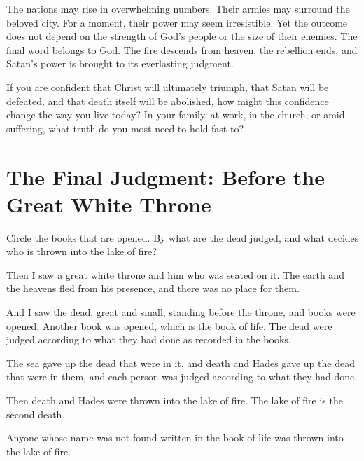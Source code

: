 The nations may rise in overwhelming numbers. Their armies may surround the beloved city. For a moment, their power may seem irresistible. Yet the outcome does not depend on the strength of God's people or the size of their enemies. The final word belongs to God. The fire descends from heaven, the rebellion ends, and Satan's power is brought to its everlasting judgment.

\begin{ReaderQuestion}
If you are confident that Christ will ultimately triumph, that Satan will be defeated, and that death itself will be abolished, how might this confidence change the way you live today? In your family, at work, in the church, or amid suffering, what truth do you most need to hold fast to?
\end{ReaderQuestion}

\section{The Final Judgment: Before the Great White Throne}

\begin{ScriptureBox2}{Circle the books that are opened. By what are the dead judged, and what decides who is thrown into the lake of fire?}

\item[20:11] Then I saw a great white throne and him who was seated on it. The earth and the heavens fled from his presence, and there was no place for them.

\item[20:12] And I saw the dead, great and small, standing before the throne, and books were opened. Another book was opened, which is the book of life. The dead were judged according to what they had done as recorded in the books.

\item[20:13] The sea gave up the dead that were in it, and death and Hades gave up the dead that were in them, and each person was judged according to what they had done.

\item[20:14] Then death and Hades were thrown into the lake of fire. The lake of fire is the second death.

\item[20:15] Anyone whose name was not found written in the book of life was thrown into the lake of fire.

\end{ScriptureBox2}

